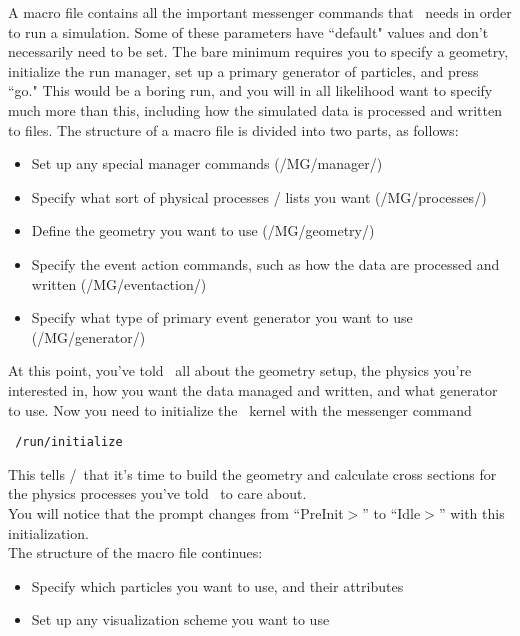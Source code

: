A macro file contains all the important messenger commands that \mage \ needs in
order to run a simulation.  Some of these parameters have ``default" values and
don't necessarily need to be set.  The bare minimum requires you to specify a
geometry, initialize the run manager, set up a primary generator of particles,
and press ``go." %
This would be a boring run, and you will in all likelihood want to specify much
more than this, including how the simulated data is processed and written to files.  
The structure of a macro file is divided into two parts, as follows:

\begin{itemize}
\item Set up any special manager commands \hbox{(/MG/manager/)}
\item Specify what sort of physical processes / lists you want
\hbox{(/MG/processes/)}
\item Define the geometry you want to use \hbox{(/MG/geometry/)}
\item Specify the event action commands, such as how the data are processed and
written \hbox{(/MG/eventaction/)}
\item Specify what type of primary event generator you want to use
\hbox{(/MG/generator/)}
\end{itemize}

\noindent At this point, you've told \mage \ all about the geometry setup, the
physics you're interested in, how you want the data managed and written, and
what generator to use.  Now you need to initialize the \geant \ kernel with the
messenger command 
\begin{lstlisting}
 /run/initialize
\end{lstlisting}

\noindent This tells \mage/\geant \ that it's time to build the geometry and
calculate cross sections for the physics processes you've told \mage \ to care
about.\\
You will notice that the prompt changes from ``PreInit$>$'' to ``Idle$>$'' with this initialization.\\
The structure of the macro file continues:

\begin{itemize}
\item Specify which particles you want to use, and their attributes
\item Set up any visualization scheme you want to use
\end{itemize}

